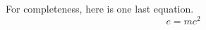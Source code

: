 \documentclass[manuscript]{aastex}
\begin{document}
For completeness, here is one last equation.
\begin{equation}
e = mc^2
\end{equation}



\end{document}
